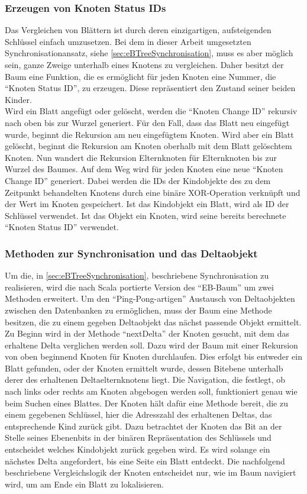\documentclass[a4paper,11pt,oneside,%
headsepline,												%
footsepline,												%
bibtotocnumbered									%
]{scrreprt}
\begin{document}
\subsubsection{Erzeugen von Knoten Status IDs}
Das Vergleichen von Blättern ist durch deren einzigartigen, aufsteigenden Schlüssel einfach umzusetzen. Bei dem in dieser Arbeit umgesetzten Synchronisationansatz, siehe \autoref{sec:eBTreeSynchronisation}, muss es aber möglich sein, ganze Zweige unterhalb eines Knotens zu vergleichen. Daher besitzt der Baum eine Funktion, die es ermöglicht für jeden Knoten eine Nummer, die \enquote{Knoten Status ID}, zu erzeugen. Diese repräsentiert den Zustand seiner beiden Kinder.\\ Wird ein Blatt angefügt oder gelöscht, werden die \enquote{Knoten Change ID} rekursiv nach oben bis zur Wurzel generiert. Für den Fall, dass das Blatt neu eingefügt wurde, beginnt die Rekursion am neu eingefügtem Knoten. Wird aber ein Blatt gelöscht, beginnt die Rekursion am Knoten oberhalb mit dem Blatt gelöschtem Knoten. Nun wandert die Rekursion Elternknoten für Elternknoten bis zur Wurzel des Baumes. Auf dem Weg wird für jeden Knoten eine neue \enquote{Knoten Change ID} generiert. Dabei werden die IDs der Kindobjekte des zu dem Zeitpunkt behandelten Knotens durch eine binäre XOR-Operation verknüpft und der Wert im Knoten gespeichert. Ist das Kindobjekt ein Blatt, wird als ID der Schlüssel verwendet. Ist das Objekt ein Knoten, wird seine bereits berechnete \enquote{Knoten Status ID} verwendet.
\subsubsection{Methoden zur Synchronisation und das Deltaobjekt}
Um die, in \autoref{sec:eBTreeSynchronisation}, beschriebene Synchronisation zu realisieren, wird die nach Scala portierte Version des \enquote{EB-Baum} um zwei Methoden erweitert. Um den \enquote{Ping-Pong-artigen} Austausch von Deltaobjekten zwischen den Datenbanken zu ermöglichen, muss der Baum eine Methode besitzen, die zu einem gegeben Deltaobjekt das nächst passende Objekt ermittelt. Zu Beginn wird in der Methode \enquote{nextDelta} der Knoten gesucht, mit dem das erhaltene Delta verglichen werden soll. Dazu wird der Baum mit einer Rekursion von oben beginnend Knoten für Knoten durchlaufen. Dies erfolgt bis entweder ein Blatt gefunden, oder der Knoten ermittelt wurde, dessen Bitebene unterhalb derer des erhaltenen Deltaelternknotens liegt. Die Navigation, die festlegt, ob nach links oder rechts am Knoten abgebogen werden soll, funktioniert genau wie beim Suchen eines Blattes. Der Knoten hält dafür eine Methode bereit, die zu einem gegebenen Schlüssel, hier die Adresszahl des erhaltenen Deltas, das entsprechende Kind zurück gibt. Dazu betrachtet der Knoten das Bit an der Stelle seines Ebenenbits in der binären Repräsentation des Schlüssels und entscheidet welches Kindobjekt zurück gegeben wird. Es wird solange ein nächstes Delta angefordert, bis eine Seite ein Blatt entdeckt. Die nachfolgend beschriebene Vergleichslogik der Knoten entscheidet nur, wie im Baum navigiert wird, um am Ende ein Blatt zu lokalisieren.\\
\end{document}
